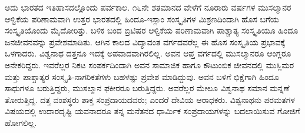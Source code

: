 ಅದು ಭಾರತದ ಇತಿಹಾಸದಲ್ಲೊಂದು ಪರ್ವಕಾಲ. ೧೬ನೇ ಶತಮಾನದ ವೇಳೆಗೆ ನೂರಾರು ವರ್ಷಗಳ ಮುಸಲ್ಮಾನರ ಆಳ್ವಿಕೆಯ ಪರಿಣಾಮವಾಗಿ ಉತ್ತರ ಭಾರತದಲ್ಲಿ ಹಿಂದೂ-ಇಸ್ಲಾಂ ಸಂಸ್ಕೃತಿಗಳ ಮಿಶ್ರಣದಿಂದಾಗಿ ಹೊಸ ಬಗೆಯ ಸಂಸ್ಕೃತಿಯೊಂದು ಮೈದೋರಿತ್ತು. ಬಳಿಕ ಬಂದ ಬ್ರಿಟಿಷರ ಆಳ್ವಿಕೆಯ ಪರಿಣಾಮವಾಗಿ ಪಾಶ್ಚಾತ್ಯ ಸಂಸ್ಕೃತಿಯೂ ಹಿಂದೂ ಜನಜೀವನವನ್ನು ಪ್ರವೇಶಮಾಡಿತು. ಆಗಿನ ಕಾಲದ ವಿದ್ಯಾವಂತ ವರ್ಗದವರೆಲ್ಲ ಈ ಹೊಸ ಸಂಸ್ಕೃತಿಯ ಪ್ರಭಾವಕ್ಕೆ ಒಳಗಾದರು. ವಿಶ್ವನಾಥ ದತ್ತನೂ ಇದಕ್ಕೆ ಅಪವಾದವಾಗಿರಲಿಲ್ಲ. ಅವನ ಆಪ್ತ ವರ್ಗದಲ್ಲಿ ಮುಸಲ್ಮಾನರೂ ಆಂಗ್ಲರೂ ಅನೇಕರಿದ್ದರು. ಇವರೆಲ್ಲರ ನಿಕಟ ಸಂಪರ್ಕದಿಂದಾಗಿ ಅವನ ಸಾಮಾಜಿಕ ಹಾಗೂ ಕೌಟುಂಬಿಕ ಜೀವನದಲ್ಲಿ ಮುಸ್ಲಿಮರ ಮತ್ತು ಪಾಶ್ಚಾತ್ಯರ ಸಂಸ್ಕೃತಿ-ನಾಗರಿಕತೆಗಳು ಬಹಳಷ್ಟು ಪ್ರವೇಶ ಮಾಡಿದ್ದುವು. ಅವನ ಬಳಿಗೆ ಭಿಕ್ಷೆಗಾಗಿ ಹಿಂದೂ ಸಾಧುಗಳೂ ಬರುತ್ತಿದ್ದರು, ಮುಸಲ್ಮಾನ ಫಕೀರರೂ ಬರುತ್ತಿದ್ದರು. ಅವರೆಲ್ಲರ ಮೇಲೂ ವಿಶ್ವನಾಥ ಸಮಾನ ಮನ್ನಣೆ ತೋರುತ್ತಿದ್ದ. ದತ್ತ ವಂಶಸ್ಥರು ಶಾಕ್ತ ಸಂಪ್ರದಾಯದವರು; ಎಂದರೆ ದೇವಿಯ ಆರಾಧಕರು. ವಿಶ್ವನಾಥನು ಪರಮತಗಳ ವಿಷಯದಲ್ಲಿ ಉದಾರದೃಷ್ಟಿ ಯವನಾದರೂ ತನ್ನ ಮನೆತನದ ಧಾರ್ಮಿಕ ಸಂಪ್ರದಾಯಗಳನ್ನು ಬದಲಾಯಿಸುವ ಗೋಜಿಗೆ ಹೋಗಲಿಲ್ಲ.

